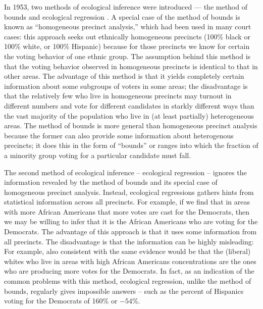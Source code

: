 \documentclass[12pt]{scrartcl}
\begin{document}
In 1953, two methods of ecological inference were introduced --- the
method of bounds \citep{duncan1953} and ecological regression
\citep{goodman1953}. A special case of the method of bounds is known
as ``homogeneous precinct analysis,'' which had been used in many
court cases: this approach seeks out ethnically homogeneous precincts
(100\% black or 100\% white, or 100\% Hispanic) because for those
precincts we know for certain the voting behavior of one ethnic group.
The assumption behind this method is that the voting behavior observed
in homogeneous precincts is identical to that in other areas. The
advantage of this method is that it yields completely certain
information about some subgroups of voters in some areas; the
disadvantage is that the relatively few who live in homogeneous
precincts may turnout in different numbers and vote for different
candidates in starkly different ways than the vast majority of the
population who live in (at least partially) heterogeneous areas.  The
method of bounds is more general than homogeneous precinct analysis
because the former can also provide some information about
heterogenous precincts; it does this in the form of ``bounds'' or
ranges into which the fraction of a minority group voting for a
particular candidate must fall.

The second method of ecological inference -- ecological regression --
ignores the information revealed by the method of bounds and its
special case of homogeneous precinct analysis. Instead, ecological
regressions gathers hints from statistical information across all
precincts. For example, if we find that in areas with more African
Americans that more votes are cast for the Democrats, then we may be
willing to infer that it is the African Americans who are voting for
the Democrats. The advantage of this approach is that it uses some
information from all precincts. The disadvantage is that the
information can be highly misleading: For example, also consistent
with the same evidence would be that the (liberal) whites who live in
areas with high African Americans concentrations are the ones who are
producing more votes for the Democrats. In fact, as an indication of
the common problems with this method, ecological regression, unlike
the method of bounds, regularly gives impossible answers -- such as
the percent of Hispanics voting for the Democrats of 160\% or $-54$\%.
\end{document}
